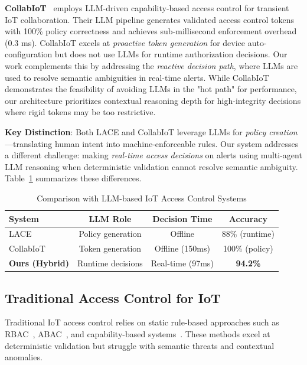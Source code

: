 \documentclass[conference]{IEEEtran}
\begin{document}
\textbf{CollabIoT}~\cite{collabiot2025} employs LLM-driven capability-based access control for transient IoT collaboration. Their LLM pipeline generates validated access control tokens with 100\% policy correctness and achieves sub-millisecond enforcement overhead (0.3 ms). CollabIoT excels at \textit{proactive token generation} for device auto-configuration but does not use LLMs for runtime authorization decisions. Our work complements this by addressing the \textit{reactive decision path}, where LLMs are used to resolve semantic ambiguities in real-time alerts. While CollabIoT demonstrates the feasibility of avoiding LLMs in the "hot path" for performance, our architecture prioritizes contextual reasoning depth for high-integrity decisions where rigid tokens may be too restrictive.

\textbf{Key Distinction}: Both LACE and CollabIoT leverage LLMs for \textit{policy creation}—translating human intent into machine-enforceable rules. Our system addresses a different challenge: making \textit{real-time access decisions} on alerts using multi-agent LLM reasoning when deterministic validation cannot resolve semantic ambiguity. Table~\ref{tab:related_comparison} summarizes these differences.

\begin{table}[h]
    \centering
    \caption{Comparison with LLM-based IoT Access Control Systems}
    \label{tab:related_comparison}
    \begin{tabular}{lccc}
        \toprule
        \textbf{System}                & \textbf{LLM Role} & \textbf{Decision Time} & \textbf{Accuracy} \\
        \midrule
        LACE~\cite{lace2025}           & Policy generation & Offline                & 88\% (runtime)    \\
        CollabIoT~\cite{collabiot2025} & Token generation  & Offline (150ms)        & 100\% (policy)    \\
        \textbf{Ours (Hybrid)}         & Runtime decisions & Real-time (97ms)       & \textbf{94.2\%}   \\
        \bottomrule
    \end{tabular}
\end{table}

\subsection{Traditional Access Control for IoT}

Traditional IoT access control relies on static rule-based approaches such as RBAC~\cite{rbac2004}, ABAC~\cite{abac2012}, and capability-based systems~\cite{capability2016}. These methods excel at deterministic validation but struggle with semantic threats and contextual anomalies.
\end{document}
